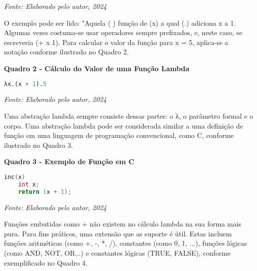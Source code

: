 \begin{center}
    \textit{Fonte: Elaborado pelo autor, 2024} %
\end{center}

O exemplo pode ser lido: "Aquela ( ) função de (x) a qual (.) adiciona x a 1. Algumas vezes costuma-se usar operadores sempre prefixados, e, neste caso, se escreveria (+ x 1). Para calcular o valor da função para x = 5, aplica-se a notação conforme ilustrado no Quadro 2.

\vspace{1cm}

\begin{center}
    \textbf{Quadro 2 - Cálculo do Valor de uma Função Lambda}
\end{center}

\begin{tcolorbox}[colback=gray!5!white, colframe=gray!75!black, title=]
\begin{lstlisting}[language=Lisp]
λx.(x + 1).5
\end{lstlisting}
\end{tcolorbox}

\begin{center}
    \textit{Fonte: Elaborado pelo autor, 2024} %
\end{center}


Uma abstração lambda sempre consiste dessas partes: o λ, o parâmetro formal e o corpo. Uma abstração lambda pode ser considerada similar a uma definição de função em uma linguagem de programação convencional, como C, conforme ilustrado no Quadro 3.

\begin{center}
    \textbf{Quadro 3 - Exemplo de Função em C}
\end{center}

\begin{tcolorbox}[colback=gray!5!white, colframe=gray!75!black, title=]
\begin{lstlisting}[language=C]
inc(x)
    int x;
    return (x + 1);
\end{lstlisting}
\end{tcolorbox}

\begin{center}
    \textit{Fonte: Elaborado pelo autor, 2024} %
\end{center}

Funções embutidas como + não existem no cálculo lambda na sua forma mais pura. Para fins práticos, uma extensão que as suporte é útil. Estas incluem funções aritméticas (como +, -, *, /), constantes (como 0, 1, ...), funções lógicas (como AND, NOT, OR...) e constantes lógicas (TRUE, FALSE), conforme exemplificado no Quadro 4.

